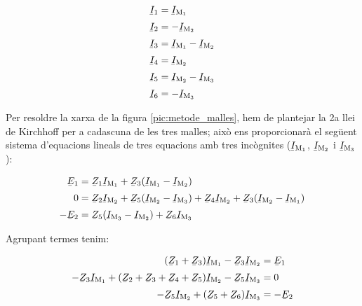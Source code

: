 \begin{subequations}
\begin{align}
    \cmplx{I}_1 &= \cmplx{I}\ped{M_1} \label{eq:malles1} \\[0.5ex]
    \cmplx{I}_2 &= -\cmplx{I}\ped{M_2} \\[0.5ex]
    \cmplx{I}_3 &= \cmplx{I}\ped{M_1}-\cmplx{I}\ped{M_2} \\[0.5ex]
    \cmplx{I}_4 &= \cmplx{I}\ped{M_2} \\[0.5ex]
    \cmplx{I}_5 &= \cmplx{I}\ped{M_2}-\cmplx{I}\ped{M_3} \\[0.5ex]
    \cmplx{I}_6 &= -\cmplx{I}\ped{M_3} \label{eq:malles2}
\end{align}
\end{subequations}

Per resoldre la xarxa de la figura \vref{pic:metode_malles}, hem de plantejar la 2a llei de Kirchhoff per a cadascuna de les tres malles; això ens proporcionarà el següent sistema d'equacions lineals de tres equacions amb tres incògnites ($\cmplx{I}\ped{M_1}$, $\cmplx{I}\ped{M_2}$ i $\cmplx{I}\ped{M_3}$):

\begin{subequations}
\begin{align}
    \cmplx{E}_1 &= \cmplx{Z}_1 \cmplx{I}\ped{M_1} + \cmplx{Z}_3 (\cmplx{I}\ped{M_1}-\cmplx{I}\ped{M_2}) \\[0.5ex]
    0 &= \cmplx{Z}_2 \cmplx{I}\ped{M_2} + \cmplx{Z}_5(\cmplx{I}\ped{M_2}-\cmplx{I}\ped{M_3}) + \cmplx{Z}_4 \cmplx{I}\ped{M_2} + \cmplx{Z}_3(\cmplx{I}\ped{M_2}-\cmplx{I}\ped{M_1}) \\[0.5ex]
    -\cmplx{E}_2 &=  \cmplx{Z}_5 (\cmplx{I}\ped{M_3}-\cmplx{I}\ped{M_2})+\cmplx{Z}_6 \cmplx{I}\ped{M_3}
\end{align}
\end{subequations}

Agrupant termes tenim:

\begin{subequations}
\begin{align}
    (\cmplx{Z}_1 + \cmplx{Z}_3) \cmplx{I}\ped{M_1} - \cmplx{Z}_3 \cmplx{I}\ped{M_2} &= \cmplx{E}_1 \\[0.5ex]
    -\cmplx{Z}_3 \cmplx{I}\ped{M_1} + (\cmplx{Z}_2 + \cmplx{Z}_3+ \cmplx{Z}_4+ \cmplx{Z}_5)\cmplx{I}\ped{M_2} - \cmplx{Z}_5 \cmplx{I}\ped{M_3} &= 0 \\[0.5ex]
     -\cmplx{Z}_5 \cmplx{I}\ped{M_2} +  (\cmplx{Z}_5 + \cmplx{Z}_6) \cmplx{I}\ped{M_3} &= -\cmplx{E}_2
\end{align}
\end{subequations}

